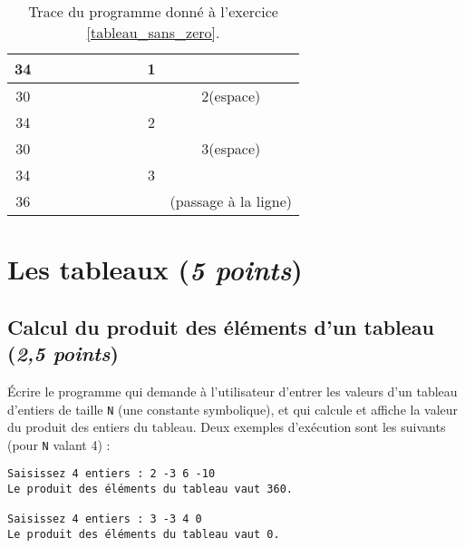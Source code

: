 \begin{enumerate}
\begin{correction}
\begin{table}[h]
\begin{tiny}
\begin{center}
\begin{tabular}[h]{|c|c|c|c|c|c|c|c|c|c|}
			34 &  &  &  &  &  &  &  &1 &  \\ \hline
			30 &  &  &  &  &  &  &  &  & 2(espace) \\ \hline
			34 &  &  &  &  &  &  &  &2 &  \\ \hline
			30 &  &  &  &  &  &  &  &  & 3(espace) \\ \hline
			34 &  &  &  &  &  &  &  &3 &  \\ \hline
			36 &  &  &  &  &  &  &  &  & (passage à la ligne) \\ \hline
		\end{tabular}
		\caption{Trace du programme donné à l'exercice \ref{tableau_sans_zero}.}
		\label{simulation}
	\end{center}
      \end{tiny}
    \end{table}
  \end{correction}
\end{enumerate}

\section{Les tableaux (\textit{5 points})}

\subsection{Calcul du produit des éléments d'un tableau (\textit{2,5 points})}

Écrire le programme qui demande à l'utilisateur d'entrer les valeurs d'un tableau d'entiers de taille \verb|N| (une constante symbolique), et qui calcule et affiche la valeur du produit des entiers du tableau. Deux exemples d'exécution sont les suivants (pour \verb|N| valant 4) :
\begin{small}
\begin{verbatim}
Saisissez 4 entiers : 2 -3 6 -10
Le produit des éléments du tableau vaut 360.

Saisissez 4 entiers : 3 -3 4 0
Le produit des éléments du tableau vaut 0.
\end{verbatim}
\end{small}

